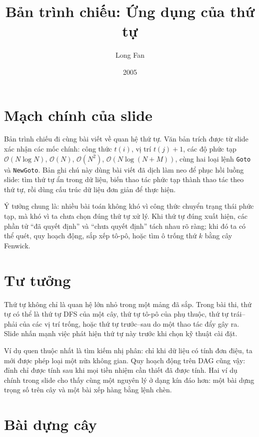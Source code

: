 \documentclass[11pt]{article}
\title{Bản trình chiếu: Ứng dụng của thứ tự}
\author{Long Fan}
\date{2005}
\newcommand{\Oh}{\mathcal{O}}
\begin{document}
\maketitle


\section{Mạch chính của slide}

Bản trình chiếu đi cùng bài viết về quan hệ thứ tự. Văn bản trích được từ
slide xác nhận các mốc chính: công thức \(t(i)\), vị trí \(t(j)+1\), các độ
phức tạp \(\Oh(N\log N)\), \(\Oh(N)\), \(\Oh(N^2)\),
\(\Oh(N\log(N+M))\), cùng hai loại lệnh \texttt{Goto} và
\texttt{NewGoto}. Bản ghi chú này dùng bài viết đã dịch làm neo để phục hồi
luồng slide: tìm thứ tự ẩn trong dữ liệu, biến thao tác phức tạp thành thao
tác theo thứ tự, rồi dùng cấu trúc dữ liệu đơn giản để thực hiện.

Ý tưởng chung là: nhiều bài toán không khó vì công thức chuyển trạng thái
phức tạp, mà khó vì ta chưa chọn đúng thứ tự xử lý. Khi thứ tự đúng xuất hiện,
các phần tử ``đã quyết định'' và ``chưa quyết định'' tách nhau rõ ràng; khi
đó ta có thể quét, quy hoạch động, sắp xếp tô-pô, hoặc tìm ô trống thứ \(k\)
bằng cây Fenwick.

\section{Tư tưởng}

Thứ tự không chỉ là quan hệ lớn nhỏ trong một mảng đã sắp. Trong bài thi,
thứ tự có thể là thứ tự DFS của một cây, thứ tự tô-pô của phụ thuộc, thứ tự
trái--phải của các vị trí trống, hoặc thứ tự trước--sau do một thao tác đẩy
gây ra. Slide nhấn mạnh việc phát hiện thứ tự này trước khi chọn kỹ thuật cài
đặt.

Ví dụ quen thuộc nhất là tìm kiếm nhị phân: chỉ khi dữ liệu có tính đơn điệu,
ta mới được phép loại một nửa không gian. Quy hoạch động trên DAG cũng vậy:
đỉnh chỉ được tính sau khi mọi tiền nhiệm cần thiết đã được tính. Hai ví dụ
chính trong slide cho thấy cùng một nguyên lý ở dạng kín đáo hơn: một bài
dựng trọng số trên cây và một bài xếp hàng bằng lệnh chèn.

\section{Bài dựng cây}
\end{document}
